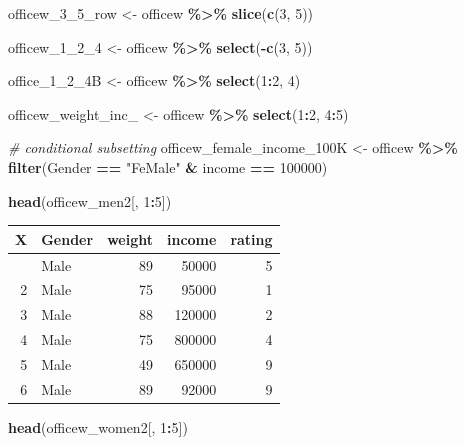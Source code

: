 \documentclass[
]{article}
\newenvironment{Shaded}{\begin{snugshade}}{\end{snugshade}}
\newcommand{\CommentTok}[1]{\textcolor[rgb]{0.56,0.35,0.01}{\textit{#1}}}
\newcommand{\DecValTok}[1]{\textcolor[rgb]{0.00,0.00,0.81}{#1}}
\newcommand{\FunctionTok}[1]{\textcolor[rgb]{0.13,0.29,0.53}{\textbf{#1}}}
\newcommand{\NormalTok}[1]{#1}
\newcommand{\OtherTok}[1]{\textcolor[rgb]{0.56,0.35,0.01}{#1}}
\newcommand{\SpecialCharTok}[1]{\textcolor[rgb]{0.81,0.36,0.00}{\textbf{#1}}}
\newcommand{\StringTok}[1]{\textcolor[rgb]{0.31,0.60,0.02}{#1}}
\begin{document}
\begin{Shaded}
\begin{Highlighting}[]
\NormalTok{officew\_3\_5\_row }\OtherTok{\textless{}{-}}\NormalTok{ officew }\SpecialCharTok{\%\textgreater{}\%}
  \FunctionTok{slice}\NormalTok{(}\FunctionTok{c}\NormalTok{(}\DecValTok{3}\NormalTok{, }\DecValTok{5}\NormalTok{))}

\NormalTok{officew\_1\_2\_4 }\OtherTok{\textless{}{-}}\NormalTok{ officew }\SpecialCharTok{\%\textgreater{}\%}
  \FunctionTok{select}\NormalTok{(}\SpecialCharTok{{-}}\FunctionTok{c}\NormalTok{(}\DecValTok{3}\NormalTok{, }\DecValTok{5}\NormalTok{))}

\NormalTok{office\_1\_2\_4B }\OtherTok{\textless{}{-}}\NormalTok{ officew }\SpecialCharTok{\%\textgreater{}\%}
  \FunctionTok{select}\NormalTok{(}\DecValTok{1}\SpecialCharTok{:}\DecValTok{2}\NormalTok{, }\DecValTok{4}\NormalTok{)}

\NormalTok{officew\_weight\_inc\_ }\OtherTok{\textless{}{-}}\NormalTok{ officew }\SpecialCharTok{\%\textgreater{}\%}
  \FunctionTok{select}\NormalTok{(}\DecValTok{1}\SpecialCharTok{:}\DecValTok{2}\NormalTok{, }\DecValTok{4}\SpecialCharTok{:}\DecValTok{5}\NormalTok{)}

\CommentTok{\# conditional subsetting}
\NormalTok{officew\_female\_income\_100K }\OtherTok{\textless{}{-}}\NormalTok{ officew }\SpecialCharTok{\%\textgreater{}\%}
  \FunctionTok{filter}\NormalTok{(Gender }\SpecialCharTok{==} \StringTok{"FeMale"} \SpecialCharTok{\&}\NormalTok{ income }\SpecialCharTok{==} \DecValTok{100000}\NormalTok{)}

\FunctionTok{head}\NormalTok{(officew\_men2[, }\DecValTok{1}\SpecialCharTok{:}\DecValTok{5}\NormalTok{])}
\end{Highlighting}
\end{Shaded}

\begin{longtable}[]{@{}rlrrr@{}}
\toprule\noalign{}
X & Gender & weight & income & rating \\
\midrule\noalign{}
\endhead
\bottomrule\noalign{}
\endlastfoot
1 & Male & 89 & 50000 & 5 \\
2 & Male & 75 & 95000 & 1 \\
3 & Male & 88 & 120000 & 2 \\
4 & Male & 75 & 800000 & 4 \\
5 & Male & 49 & 650000 & 9 \\
6 & Male & 89 & 92000 & 9 \\
\end{longtable}

\begin{Shaded}
\begin{Highlighting}[]
\FunctionTok{head}\NormalTok{(officew\_women2[, }\DecValTok{1}\SpecialCharTok{:}\DecValTok{5}\NormalTok{])}
\end{Highlighting}
\end{Shaded}
\end{document}
